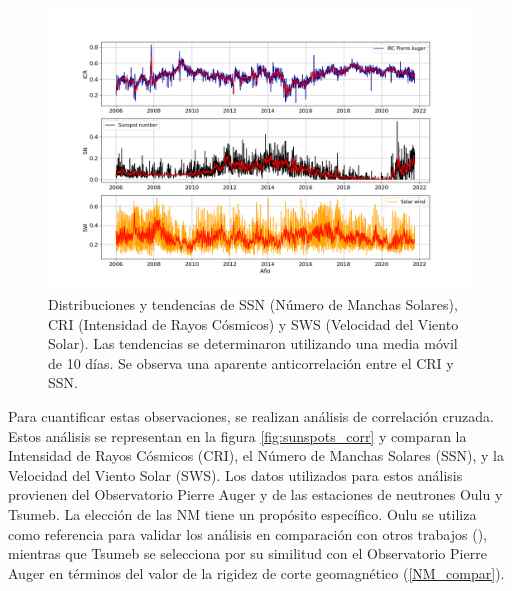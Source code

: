 \begin{figure}
    \includegraphics[width=1.05\linewidth]{Figs/Figr/CRI_SN_SW_over.png}
    \caption{Distribuciones y tendencias de SSN (Número de Manchas Solares), CRI (Intensidad de Rayos Cósmicos) y SWS (Velocidad del Viento Solar). Las tendencias se determinaron utilizando una media móvil de 10 días. Se observa una aparente anticorrelación entre el CRI y SSN.}
    \label{fig:CRIvsSN}
\end{figure}

Para cuantificar estas observaciones, se realizan análisis de correlación cruzada. Estos análisis se representan en la figura \ref{fig:sunspots_corr} y comparan la Intensidad de Rayos Cósmicos (CRI), el Número de Manchas Solares (SSN), y la Velocidad del Viento Solar (SWS). Los datos utilizados para estos análisis provienen del Observatorio Pierre Auger y de las estaciones de neutrones Oulu y Tsumeb. La elección de las NM tiene un propósito específico. Oulu se utiliza como referencia para validar los análisis en comparación con otros trabajos (\cite{Oloketuyi_2020}), mientras que Tsumeb se selecciona por su similitud con el Observatorio Pierre Auger en términos del valor de la rigidez de corte geomagnético (\ref{NM_compar}).


